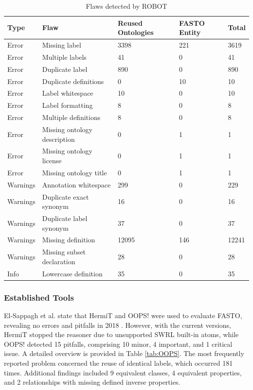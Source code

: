 \documentclass[
]{ceurart}
\begin{document}
\begin{table} [t]
    \centering
    \caption{Flaws detected by ROBOT}
    \label{tab:ROBOT}
    \begin{tabular}{lllll} 
    \toprule
         Type & Flaw & Reused Ontologies & FASTO Entity & Total \\ 
         \midrule
         Error & Missing label & 3398 & 221 & 3619 \\
         Error & Multiple labels & 41 & 0 & 41\\
         Error & Duplicate label & 890 & 0 &  890\\
         Error & Duplicate definitions & 0 & 10 & 10 \\
         Error & Label whitespace & 10 & 0 &  10\\
         Error & Label formatting & 8 & 0 & 8 \\
         Error & Multiple definitions & 8 & 0 & 8 \\
         Error & Missing ontology description & 0 & 1 & 1\\
         Error & Missing ontology license & 0 & 1 & 1 \\
         Error & Missing ontology title & 0 & 1& 1\\
         
         Warnings & Annotation whitespace & 299 & 0 & 229\\
         Warnings & Duplicate exact synonym & 16 & 0& 16 \\
         Warnings & Duplicate label synonym & 37 & 0& 37\\
         Warnings & Missing definition & 12095 & 146& 12241\\
         Warnings & Missing subset declaration & 28 & 0& 28\\
         
         Info &  Lowercase definition & 35 & 0& 35\\ 
         \bottomrule
    \end{tabular}
\end{table}

\subsubsection{Established Tools}

El-Sappagh et al. state that HermiT and OOPS! were used to evaluate FASTO, revealing no errors and pitfalls in 2018 \cite{ElSappagh2019_FASTO}. However, with the current versions, HermiT stopped the reasoner due to unsupported SWRL built-in atoms, while OOPS! detected 15 pitfalls, comprising 10 minor, 4 important, and 1 critical issue. A detailed overview is provided in Table \ref{tab:OOPS}. The most frequently reported problem concerned the reuse of identical labels, which occurred 181 times. Additional findings included 9 equivalent classes, 4 equivalent properties, and 2 relationships with missing defined inverse properties.
\end{document}
